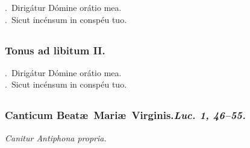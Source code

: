 \documentclass[12pt]{article} %
\newenvironment{rubric}{\color{benred8} \itshape \leftskip 0in \setlength{\parindent}{0.25in}}{\vspace{2 mm}}
\newenvironment{response}{\leftskip 0in \setlength{\parindent}{0in}}{\vspace{2 mm}}
\let\oldVbar\Vbar
\renewcommand{\Vbar}{\textcolor{benred8}{\oldVbar .}}
\let\oldRbar\Rbar
\renewcommand{\Rbar}{\textcolor{benred8}{\oldRbar .}}
\def\capitulumSpace{\hspace{20 mm}}
\begin{document}
\gresetfirstlineaboveinitial{\small \textsc{ \textbf{\textcolor{benred8}{VIII}}}}{\small \textsc{ \textbf{\textcolor{benred8}{VIII}}}}

\begin{response}
\Vbar\ Dirig\'{a}tur D\'{o}mine or\'{a}tio mea.\\
\Rbar\ Sicut inc\'{e}nsum in consp\'{e}u tuo.

\end{response}


\subsection*{}

\subsubsection*{Tonus ad libitum II.}

\gresetfirstlineaboveinitial{\small \textsc{ \textbf{\textcolor{benred8}{I}}}}{\small \textsc{ \textbf{\textcolor{benred8}{I}}}}

\begin{response}
\Vbar\ Dirig\'{a}tur D\'{o}mine or\'{a}tio mea.\\
\Rbar\ Sicut inc\'{e}nsum in consp\'{e}u tuo.

\end{response}


\subsection*{}

\subsubsection*{Canticum Beat\ae\ Mari\ae\ Virginis.\capitulumSpace \emph{Luc. 1, 46--55.}}

\begin{rubric}
Canitur Antiphona propria.

\end{rubric}
\end{document}

